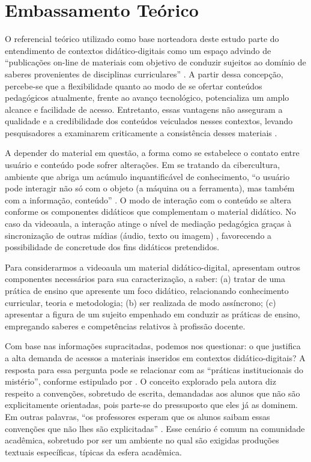 \section{Embassamento Teórico}\label{sec-embasamento}

O referencial teórico utilizado como base norteadora deste estudo parte
do entendimento de contextos didático-digitais como um espaço advindo de
``publicações on-line de materiais com objetivo de conduzir sujeitos ao
domínio de saberes provenientes de disciplinas curriculares''
\cite[p.~46]{laurentino2023}. A partir dessa concepção, percebe-se
que a flexibilidade quanto ao modo de se ofertar conteúdos pedagógicos
atualmente, frente ao avanço tecnológico, potencializa um amplo alcance
e facilidade de acesso. Entretanto, essas vantagens não asseguram a
qualidade e a credibilidade dos conteúdos veiculados nesses contextos,
levando pesquisadores a examinarem criticamente a consistência desses
materiais \cite{bessa2020,laurentino_videoaulas_2019}.

A depender do material em questão, a forma como se estabelece o contato
entre usuário e conteúdo pode sofrer alterações. Em se tratando da
cibercultura, ambiente que abriga um acúmulo inquantificável de
conhecimento, ``o usuário pode interagir não só com o objeto (a máquina
ou a ferramenta), mas também com a informação, conteúdo'' \cite[p.~8]{rocha2005}. O modo de interação com o conteúdo se altera
conforme os componentes didáticos que complementam o material didático.
No caso da videoaula, a interação atinge o nível de mediação pedagógica
graças à sincronização de outras mídias (áudio, texto ou imagem)
\cite{barrere2014}, favorecendo a possibilidade de concretude dos fins
didáticos pretendidos.

Para considerarmos a videoaula um material didático-digital, \textcite{laurentino2023} apresentam outros componentes necessários para sua
caracterização, a saber: (a) tratar de uma prática de ensino que
apresente um foco didático, relacionando conhecimento curricular, teoria
e metodologia; (b) ser realizada de modo assíncrono; (c) apresentar a
figura de um sujeito empenhado em conduzir as práticas de ensino,
empregando saberes e competências relativos à profissão docente.

Com base nas informações supracitadas, podemos nos questionar: o que
justifica a alta demanda de acessos a materiais inseridos em contextos
didático-digitais? A resposta para essa pergunta pode se relacionar com
as ``práticas institucionais do mistério'', conforme estipulado por
\textcite{lillis1999}. O conceito explorado pela autora diz respeito a
convenções, sobretudo de escrita, demandadas aos alunos que não são
explicitamente orientadas, pois parte-se do pressuposto que eles já as
dominem. Em outras palavras, ``os professores esperam que os alunos
saibam essas convenções que não lhes são explicitadas'' \cite[p.~363]{fiad2011}. Esse cenário é comum na comunidade acadêmica, sobretudo por ser um
ambiente no qual são exigidas produções textuais específicas, típicas da
esfera acadêmica.

